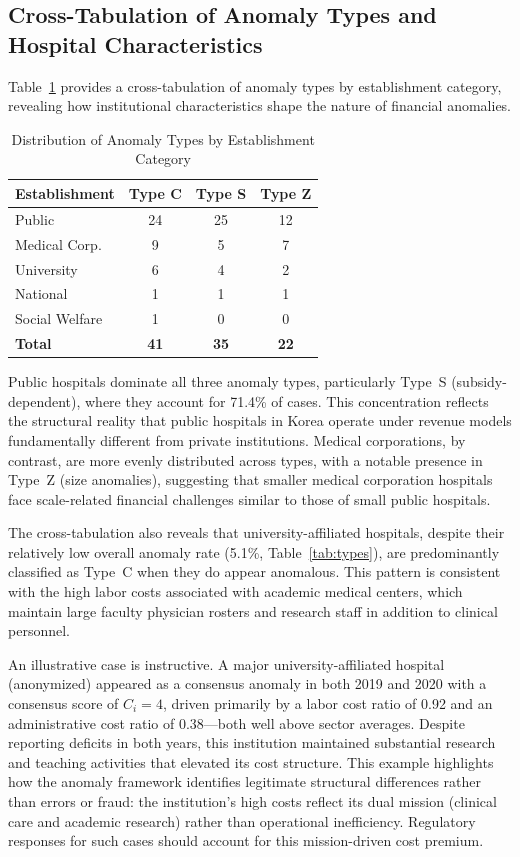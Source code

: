 \documentclass{ieeeaccess}
\begin{document}
\subsection{Cross-Tabulation of Anomaly Types and Hospital Characteristics}
\label{subsec:crosstab}

Table~\ref{tab:cross_type_est} provides a cross-tabulation of anomaly types by establishment category, revealing how institutional characteristics shape the nature of financial anomalies.

\begin{table}[!t]
\centering
\caption{Distribution of Anomaly Types by Establishment Category}
\label{tab:cross_type_est}
\begin{tabular}{@{}lccc@{}}
\toprule
\textbf{Establishment} & \textbf{Type C} & \textbf{Type S} & \textbf{Type Z} \\
\midrule
Public & 24 & 25 & 12 \\
Medical Corp. & 9 & 5 & 7 \\
University & 6 & 4 & 2 \\
National & 1 & 1 & 1 \\
Social Welfare & 1 & 0 & 0 \\
\midrule
\textbf{Total} & \textbf{41} & \textbf{35} & \textbf{22} \\
\bottomrule
\end{tabular}
\end{table}

Public hospitals dominate all three anomaly types, particularly Type~S (subsidy-dependent), where they account for 71.4\% of cases. This concentration reflects the structural reality that public hospitals in Korea operate under revenue models fundamentally different from private institutions. Medical corporations, by contrast, are more evenly distributed across types, with a notable presence in Type~Z (size anomalies), suggesting that smaller medical corporation hospitals face scale-related financial challenges similar to those of small public hospitals.

The cross-tabulation also reveals that university-affiliated hospitals, despite their relatively low overall anomaly rate (5.1\%, Table~\ref{tab:types}), are predominantly classified as Type~C when they do appear anomalous. This pattern is consistent with the high labor costs associated with academic medical centers, which maintain large faculty physician rosters and research staff in addition to clinical personnel.

An illustrative case is instructive. A major university-affiliated hospital (anonymized) appeared as a consensus anomaly in both 2019 and 2020 with a consensus score of $C_i = 4$, driven primarily by a labor cost ratio of 0.92 and an administrative cost ratio of 0.38---both well above sector averages. Despite reporting deficits in both years, this institution maintained substantial research and teaching activities that elevated its cost structure. This example highlights how the anomaly framework identifies legitimate structural differences rather than errors or fraud: the institution's high costs reflect its dual mission (clinical care and academic research) rather than operational inefficiency. Regulatory responses for such cases should account for this mission-driven cost premium.
\end{document}
